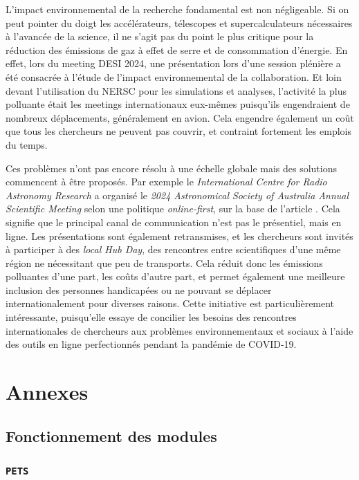 \documentclass{book}
\def\pets{\texttt{PETS}\xspace}
\begin{document}
L'impact environnemental de la recherche fondamental est non négligeable. Si on peut pointer du doigt les accélérateurs, télescopes et supercalculateurs nécessaires à l'avancée de la science, il ne s'agit pas du point le plus critique pour la réduction des émissions de gaz à effet de serre et de consommation d'énergie. En effet, lors du meeting DESI 2024, une présentation lors d'une session plénière a été consacrée à l'étude de l'impact environnemental de la collaboration. Et loin devant l'utilisation du NERSC pour les simulations et analyses, l'activité la plus polluante était les meetings internationaux eux-mêmes puisqu'ils engendraient de nombreux déplacements, généralement en avion. Cela engendre également un coût que tous les chercheurs ne peuvent pas couvrir, et contraint fortement les emplois du temps.

Ces problèmes n'ont pas encore résolu à une échelle globale mais des solutions commencent à être proposés. Par exemple le \textit{International Centre for Radio Astronomy Research} a organisé le \textit{2024 Astronomical Society of Australia Annual Scientific Meeting} selon une politique \textit{online-first}, sur la base de l'article \cite{sarabipour_changing_2021}. Cela signifie que le principal canal de communication n'est pas le présentiel, mais en ligne. Les présentations sont également retransmises, et les chercheurs sont invités à participer à des \textit{local Hub Day}, des rencontres entre scientifiques d'une même région ne nécessitant que peu de transports. Cela réduit donc les émissions polluantes d'une part, les coûts d'autre part, et permet également une meilleure inclusion des personnes handicapées ou ne pouvant se déplacer internationalement pour diverses raisons. Cette initiative est particulièrement intéressante, puisqu'elle essaye de concilier les besoins des rencontres internationales de chercheurs aux problèmes environnementaux et sociaux à l'aide des outils en ligne perfectionnés pendant la pandémie de COVID-19.

\appendix
\chapter{Annexes}

\section{Fonctionnement des modules}

\subsection{\pets}
\label{anx:pets}
\end{document}
